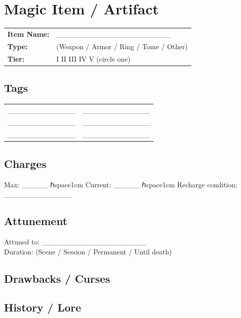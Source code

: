\documentclass[11pt]{article}
\begin{document}
\section*{Magic Item / Artifact}

\noindent
\begin{tabularx}{\textwidth}{X X}
\textbf{Item Name:} & ______________________ \\
\textbf{Type:} & (Weapon / Armor / Ring / Tome / Other) \\
\textbf{Tier:} & I II III IV V (circle one) \\
\end{tabularx}

\subsection*{Tags}
\small
\begin{tabularx}{\textwidth}{X X}
_____________ & _____________ \\
_____________ & _____________ \\
_____________ & _____________ \\
\end{tabularx}
\normalsize

\subsection*{Charges}
Max: _____ ℎspace{1cm} Current: _____ ℎspace{1cm} Recharge condition: _____________

\subsection*{Attunement}
\noindent Attuned to: ____________________ \\
Duration: (Scene / Session / Permanent / Until death)

\subsection*{Drawbacks / Curses}
\vspace{1cm}

\subsection*{History / Lore}
\vspace{2cm}
\end{document}
